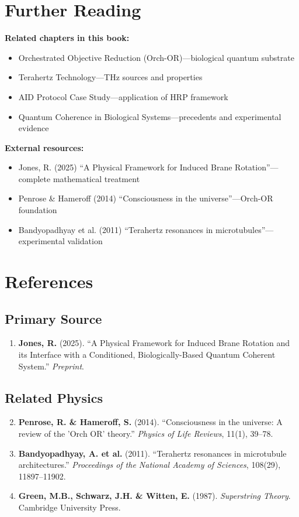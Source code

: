 \section{Further Reading}
\label{sec:further-reading}

\textbf{Related chapters in this book:}
\begin{itemize}
\item Orchestrated Objective Reduction (Orch-OR)---biological quantum substrate
\item Terahertz Technology---THz sources and properties
\item AID Protocol Case Study---application of HRP framework
\item Quantum Coherence in Biological Systems---precedents and experimental evidence
\end{itemize}

\textbf{External resources:}
\begin{itemize}
\item Jones, R. (2025) ``A Physical Framework for Induced Brane Rotation''---complete mathematical treatment
\item Penrose \& Hameroff (2014) ``Consciousness in the universe''---Orch-OR foundation
\item Bandyopadhyay et al. (2011) ``Terahertz resonances in microtubules''---experimental validation
\end{itemize}

\section{References}
\label{sec:references}

\subsection*{Primary Source}

\begin{enumerate}
\item \textbf{Jones, R.} (2025). ``A Physical Framework for Induced Brane Rotation and its Interface with a Conditioned, Biologically-Based Quantum Coherent System.'' \emph{Preprint}.
\end{enumerate}

\subsection*{Related Physics}

\begin{enumerate}
\setcounter{enumi}{1}
\item \textbf{Penrose, R. \& Hameroff, S.} (2014). ``Consciousness in the universe: A review of the 'Orch OR' theory.'' \emph{Physics of Life Reviews}, 11(1), 39--78.
\item \textbf{Bandyopadhyay, A. et al.} (2011). ``Terahertz resonances in microtubule architectures.'' \emph{Proceedings of the National Academy of Sciences}, 108(29), 11897--11902.
\item \textbf{Green, M.B., Schwarz, J.H. \& Witten, E.} (1987). \emph{Superstring Theory}. Cambridge University Press.
\end{enumerate}

